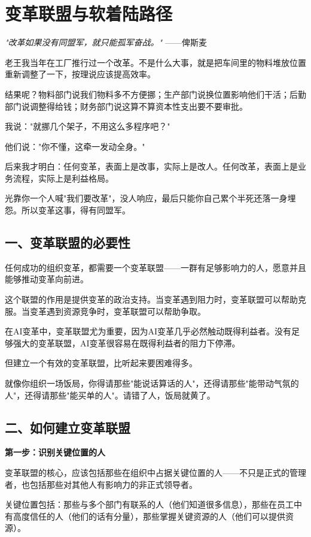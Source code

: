 \chapter{变革联盟与软着陆路径}


\textit{"改革如果没有同盟军，就只能孤军奋战。"}
——俾斯麦


老王我当年在工厂推行过一个改革。不是什么大事，就是把车间里的物料堆放位置重新调整了一下，按理说应该提高效率。

结果呢？物料部门说我们物料多不方便挪；生产部门说换位置影响他们干活；后勤部门说调整得给钱；财务部门说这算不算资本性支出要不要审批。

我说："就挪几个架子，不用这么多程序吧？"

他们说："你不懂，这牵一发动全身。"

后来我才明白：任何变革，表面上是改事，实际上是改人。任何改革，表面上是业务流程，实际上是利益格局。

光靠你一个人喊"我们要改革"，没人响应，最后只能你自己累个半死还落一身埋怨。所以变革这事，得有同盟军。

\section{一、变革联盟的必要性}


任何成功的组织变革，都需要一个变革联盟——一群有足够影响力的人，愿意并且能够推动变革向前进。

这个联盟的作用是提供变革的政治支持。当变革遇到阻力时，变革联盟可以帮助克服。当变革遇到资源竞争时，变革联盟可以帮助争取。

在AI变革中，变革联盟尤为重要，因为AI变革几乎必然触动既得利益者。没有足够强大的变革联盟，AI变革很容易在既得利益者的阻力下停滞。

但建立一个有效的变革联盟，比听起来要困难得多。

就像你组织一场饭局，你得请那些"能说话算话的人"，还得请那些"能带动气氛的人"，还得请那些"能买单的人"。请错了人，饭局就黄了。

\section{二、如何建立变革联盟}


\textbf{第一步：识别关键位置的人}

变革联盟的核心，应该包括那些在组织中占据关键位置的人——不只是正式的管理者，也包括那些对其他人有影响力的非正式领导者。

关键位置包括：那些与多个部门有联系的人（他们知道很多信息），那些在员工中有高度信任的人（他们的话有分量），那些掌握关键资源的人（他们可以提供资源）。

